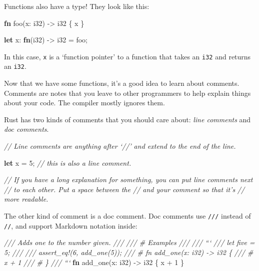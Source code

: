 \documentclass[a4paper,]{book}
\newenvironment{Shaded}{\begin{snugshade}}{\end{snugshade}}
\newcommand{\KeywordTok}[1]{\textcolor[rgb]{0.13,0.29,0.53}{\textbf{{#1}}}}
\newcommand{\DataTypeTok}[1]{\textcolor[rgb]{0.13,0.29,0.53}{{#1}}}
\newcommand{\DecValTok}[1]{\textcolor[rgb]{0.00,0.00,0.81}{{#1}}}
\newcommand{\CommentTok}[1]{\textcolor[rgb]{0.56,0.35,0.01}{\textit{{#1}}}}
\newcommand{\NormalTok}[1]{{#1}}
\begin{document}
Functions also have a type! They look like this:

\begin{Shaded}
\begin{Highlighting}[]
\KeywordTok{fn} \NormalTok{foo(x: }\DataTypeTok{i32}\NormalTok{) -> }\DataTypeTok{i32} \NormalTok{\{ x \}}

\KeywordTok{let} \NormalTok{x: }\KeywordTok{fn}\NormalTok{(}\DataTypeTok{i32}\NormalTok{) -> }\DataTypeTok{i32} \NormalTok{= foo;}
\end{Highlighting}
\end{Shaded}

In this case, \texttt{x} is a `function pointer' to a function that
takes an \texttt{i32} and returns an \texttt{i32}.


Now that we have some functions, it's a good idea to learn about
comments. Comments are notes that you leave to other programmers to help
explain things about your code. The compiler mostly ignores them.

Rust has two kinds of comments that you should care about: \emph{line
comments} and \emph{doc comments}.

\begin{Shaded}
\begin{Highlighting}[]
\CommentTok{// Line comments are anything after ‘//’ and extend to the end of the line.}

\KeywordTok{let} \NormalTok{x = }\DecValTok{5}\NormalTok{; }\CommentTok{// this is also a line comment.}

\CommentTok{// If you have a long explanation for something, you can put line comments next}
\CommentTok{// to each other. Put a space between the // and your comment so that it’s}
\CommentTok{// more readable.}
\end{Highlighting}
\end{Shaded}

The other kind of comment is a doc comment. Doc comments use
\texttt{///} instead of \texttt{//}, and support Markdown notation
inside:

\begin{Shaded}
\begin{Highlighting}[]
\CommentTok{/// Adds one to the number given.}
\CommentTok{///}
\CommentTok{/// # Examples}
\CommentTok{///}
\CommentTok{/// ```}
\CommentTok{/// let five = 5;}
\CommentTok{///}
\CommentTok{/// assert_eq!(6, add_one(5));}
\CommentTok{/// # fn add_one(x: i32) -> i32 \{}
\CommentTok{/// #     x + 1}
\CommentTok{/// # \}}
\CommentTok{/// ```}
\KeywordTok{fn} \NormalTok{add_one(x: }\DataTypeTok{i32}\NormalTok{) -> }\DataTypeTok{i32} \NormalTok{\{}
    \NormalTok{x + }\DecValTok{1}
\NormalTok{\}}
\end{Highlighting}
\end{Shaded}
\end{document}
